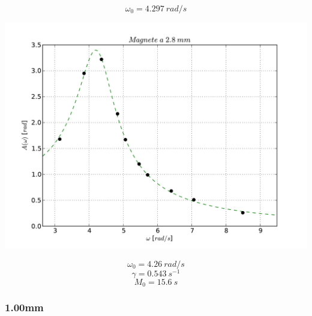 $$\omega_{0} = 4.297\ rad/s$$
\begin{center}
\includegraphics[scale=0.5]{"../grafici/Magnetea28mm"}

$$ \omega_0 = 4.26\ rad/s $$
$$ \gamma = 0.543\ s^{-1} $$
$$ M_0 = 15.6\ s$$

\end{center}


\subsubsection{1.00mm}

